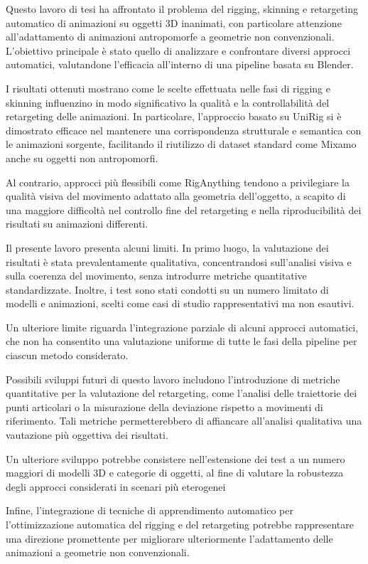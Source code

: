 Questo lavoro di tesi ha affrontato il problema del rigging, skinning e retargeting automatico di animazioni su oggetti 3D inanimati, con particolare attenzione all'adattamento di animazioni antropomorfe a geometrie non convenzionali. L'obiettivo principale è stato quello di analizzare e confrontare diversi approcci automatici, valutandone l'efficacia all'interno di una pipeline basata su Blender.

I risultati ottenuti mostrano come le scelte effettuata nelle fasi di rigging e skinning influenzino in modo significativo la qualità e la controllabilità del retargeting delle animazioni. In particolare, l'approccio basato su UniRig si è dimostrato efficace nel mantenere una corrispondenza strutturale e semantica con le animazioni sorgente, facilitando il riutilizzo di dataset standard come Mixamo anche su oggetti non antropomorfi.

Al contrario, approcci più flessibili come RigAnything tendono a privilegiare la qualità visiva del movimento adattato alla geometria dell'oggetto, a scapito di una maggiore difficoltà nel controllo fine del retargeting e nella riproducibilità dei risultati su animazioni differenti.

Il presente lavoro presenta alcuni limiti. In primo luogo, la valutazione dei risultati è stata prevalentamente qualitativa, concentrandosi sull'analisi visiva e sulla coerenza del movimento, senza introdurre metriche quantitative standardizzate. Inoltre, i test sono stati condotti su un numero limitato di modelli e animazioni, scelti come casi di studio rappresentativi ma non esautivi.

Un ulteriore limite riguarda l'integrazione parziale di alcuni approcci automatici, che non ha consentito una valutazione uniforme di tutte le fasi della pipeline per ciascun metodo considerato.

Possibili sviluppi futuri di questo lavoro includono l'introduzione di metriche quantitative per la valutazione del retargeting, come l'analisi delle traiettorie dei punti articolari o la misurazione della deviazione rispetto a movimenti di riferimento. Tali metriche permetterebbero di affiancare all'analisi qualitativa una vautazione più oggettiva dei risultati.

Un ulteriore sviluppo potrebbe consistere nell'estensione dei test a un numero maggiori di modelli 3D e categorie di oggetti, al fine di valutare la robustezza degli approcci considerati in scenari più eterogenei

Infine, l'integrazione di tecniche di apprendimento automatico per l'ottimizzazione automatica del rigging e del retargeting potrebbe rappresentare una direzione promettente per migliorare ulteriormente l'adattamento delle animazioni a geometrie non convenzionali.